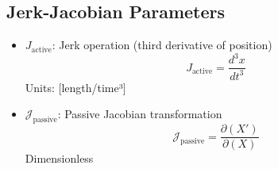 \documentclass{article}
\begin{document}
\subsection{Jerk-Jacobian Parameters}

\begin{itemize}
\item $J_{\text{active}}$: Jerk operation (third derivative of position)
    \begin{equation}
    J_{\text{active}} = \frac{d^3x}{dt^3}
    \end{equation}
    Units: [length/time³]
    
\item $\mathcal{J}_{\text{passive}}$: Passive Jacobian transformation
    \begin{equation}
    \mathcal{J}_{\text{passive}} = \frac{\partial(X')}{\partial(X)}
    \end{equation}
    Dimensionless
\end{itemize}
\end{document}
